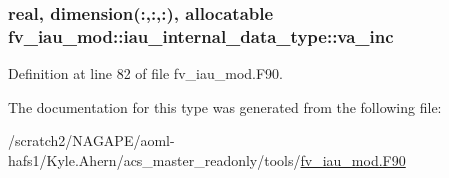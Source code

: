 \subsubsection[{va\-\_\-inc}]{\setlength{\rightskip}{0pt plus 5cm}real, dimension(\-:,\-:,\-:), allocatable fv\-\_\-iau\-\_\-mod\-::iau\-\_\-internal\-\_\-data\-\_\-type\-::va\-\_\-inc\hspace{0.3cm}{\ttfamily [private]}}\label{structfv__iau__mod_1_1iau__internal__data__type_abf93781f5201e7988f4fb02023067d1c}


Definition at line 82 of file fv\-\_\-iau\-\_\-mod.\-F90.



The documentation for this type was generated from the following file\-:\begin{DoxyCompactItemize}
\item 
/scratch2/\-N\-A\-G\-A\-P\-E/aoml-\/hafs1/\-Kyle.\-Ahern/acs\-\_\-master\-\_\-readonly/tools/\hyperlink{fv__iau__mod_8F90}{fv\-\_\-iau\-\_\-mod.\-F90}\end{DoxyCompactItemize}
